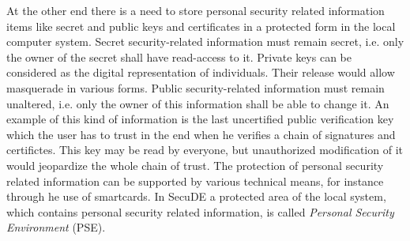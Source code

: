 At the other end there is a need to store personal security related information items
like secret and public keys and certificates in a protected form in the 
local computer system.
\bi
\m Secret security-related information must remain secret, i.e. only the owner of the secret shall have
   read-access to it. Private keys can be considered as the digital
representation of individuals. Their release would allow masquerade
in various forms.
\m Public security-related information must remain unaltered, i.e. only the owner of this information
   shall be able to change it. An example of this kind of information is the last uncertified
   public verification key which the user has to trust in the end when he verifies a chain of 
   signatures and certifictes. This key may be read by everyone, but
   unauthorized modification of it would jeopardize the whole chain of trust.
\ei
 The protection of personal security related information can be supported by various technical means, for
instance through he use of smartcards. 
In SecuDE a protected area of the local system, which contains personal security related information, is called {\em Personal Security Environment} (PSE).

